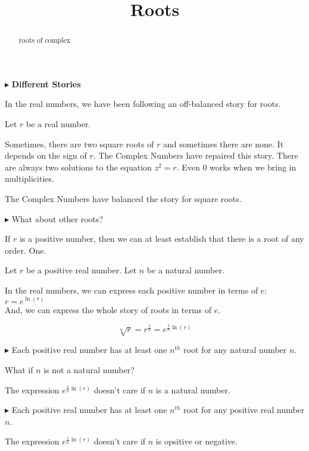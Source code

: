 \documentclass{ximera}
\title{Roots}
\begin{document}
\begin{abstract}
roots of complex
\end{abstract}
\maketitle




$\blacktriangleright$ \textbf{Different Stories}

In the real numbers, we have been following an off-balanced story for roots.

Let $r$ be a real number.

Sometimes, there are two square roots of $r$ and sometimes there are none.  It depends on the sign of $r$. The Complex Numbers have repaired this story.  There are always two solutions to the equation $z^2 = r$.  Even $0$ works when we bring in multiplicities.

The Complex Numbers have balanced the story for square roots. 


\textbf{\textcolor{red!90!darkgray}{$\blacktriangleright$}} What about other roots?





If $r$ is a positive number, then we can at least establish that there is a root of any order. One.


Let $r$ be a positive real number.
Let $n$ be a natural number.



In the real numbers, we can express each positive number in terms of $e$: $r = e^{\ln(r)}$ \\


And, we can express the whole story of roots in terms of $e$.

\[
\sqrt[n]{r} = r^{\tfrac{1}{n}}= e^{\tfrac{1}{n} \ln(r)}
\]


$\blacktriangleright$ Each positive real number has at least one $n^{th}$ root for any natural number $n$.


What if $n$ is not a natural number?


The expression $e^{\tfrac{1}{n} \ln(r)}$ doesn't care if $n$ is a natural number.



$\blacktriangleright$ Each positive real number has at least one $n^{th}$ root for any positive real number $n$.


The expression $e^{\tfrac{1}{n} \ln(r)}$ doesn't care if $n$ is opsitive or negative.
\end{document}
